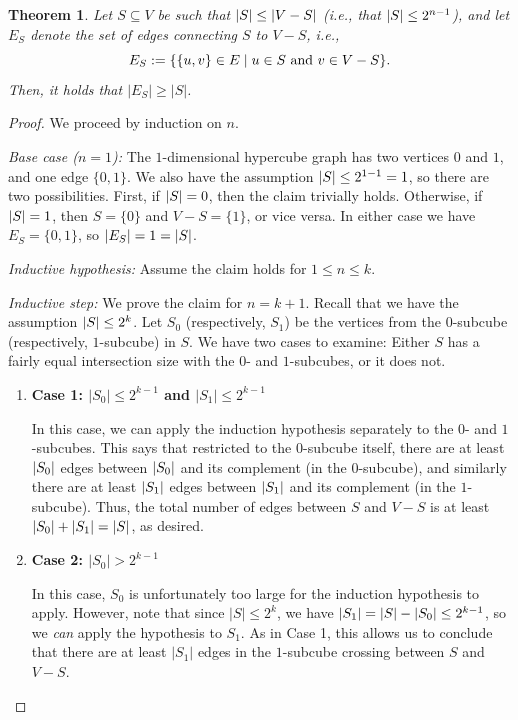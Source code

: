 \documentclass[11pt]{article}
\newcounter{thm}
\newtheorem{theorem}{Theorem}[thm]
\begin{document}
\begin{theorem}
    Let $S\subseteq V$ be such that $\left\lvert S \right\rvert\leq \left\lvert V-S \right\rvert$ (i.e., that $\left\lvert S \right\rvert\leq 2^{n-1}$), and let $E_{S}$ denote the set of edges connecting $S$ to $V-S$, i.e.,
    \[
        E_S:={\left\{\{u,v\}\in E\mid u \in S \text{ and }v\in V-S\right\}}.
    \]
    Then, it holds that $|E_{S}| \geq |S|$.
\end{theorem}
\begin{proof}
We proceed by induction on $n$.


\emph{Base case ($n=1$):} The $1$-dimensional hypercube graph has two vertices $0$ and $1$, and one edge $\{0,1\}$. We also have the assumption $\left\lvert S \right\rvert \le 2^{1-1} = 1$, so there are two possibilities. First, if $\left\lvert S \right\rvert = 0$, then the claim trivially holds. Otherwise, if $\left\lvert S \right\rvert = 1$, then $S = \{0\}$ and $V - S = \{1\}$, or vice versa. In either case we have $E_S = \{0,1\}$, so $|E_{S}| = 1 = \left\lvert S \right\rvert$.

\emph{Inductive hypothesis:} Assume the claim holds for $1\leq n\leq k$.

\emph{Inductive step:} We prove the claim for $n=k+1$. Recall that we have the assumption $\left\lvert S \right\rvert\leq 2^k$. Let $S_0$ (respectively, $S_1$) be the vertices from the $0$-subcube (respectively, $1$-subcube) in $S$. We have two cases to examine: Either $S$ has a fairly equal intersection size with the $0$- and $1$-subcubes, or it does not.

\begin{enumerate}
  \item {\bf Case 1: $|S_0| \leq 2^{k-1}$ and  $|S_1| \leq 2^{k-1}$}

In this case, we can apply the induction hypothesis separately to the $0$- and $1$-subcubes. This says that restricted to the $0$-subcube itself, there are at least $\left\lvert S_0 \right\rvert$ edges between $\left\lvert S_0 \right\rvert$ and its complement (in the $0$-subcube), and similarly there are at least $\left\lvert S_1 \right\rvert$ edges between $\left\lvert S_1 \right\rvert$ and its complement (in the $1$-subcube). Thus, the total number of edges between $S$ and $V-S$ is at least $\left\lvert S_0 \right\rvert+\left\lvert S_1 \right\rvert=\left\lvert S \right\rvert$, as desired.

  \item {\bf Case 2: $|S_0| > 2^{k-1}$}

In this case, $S_0$ is unfortunately too large for the induction hypothesis to apply. However, note that since $|S|\leq 2^{k}$, we have $\left\lvert S_1 \right\rvert = \left\lvert S \right\rvert - \left\lvert S_0 \right\rvert \leq 2^{k-1}$, so we \emph{can} apply the hypothesis to $S_1$. As in Case 1, this allows us to conclude that there are at least $|S_1|$ edges in the $1$-subcube crossing between $S$ and $V - S$. 


\end{enumerate}
\end{proof}
\end{document}
